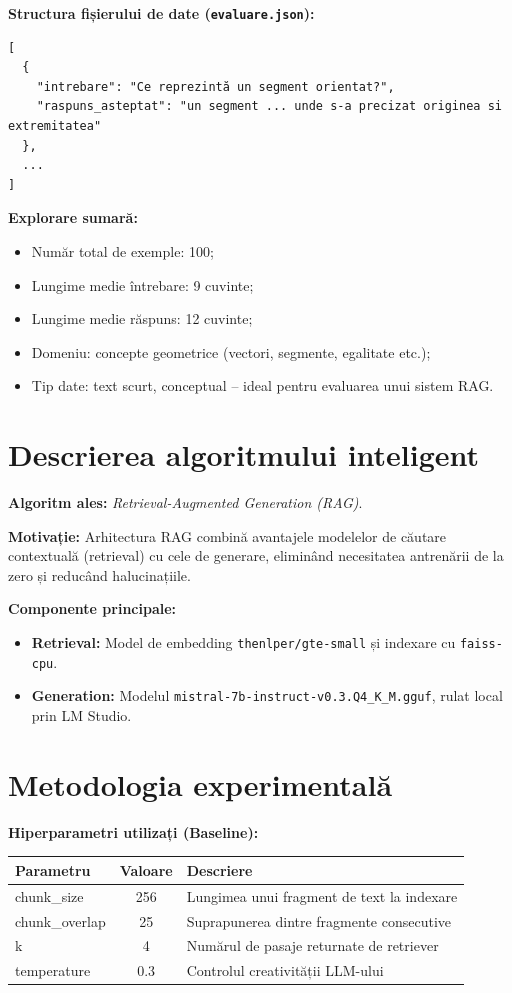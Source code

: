 \documentclass[12pt,a4paper]{report}
\begin{document}
\textbf{Structura fișierului de date (\texttt{evaluare.json}):}
\begin{verbatim}
[
  {
    "intrebare": "Ce reprezintă un segment orientat?",
    "raspuns_asteptat": "un segment ... unde s-a precizat originea si extremitatea"
  },
  ...
]
\end{verbatim}

\textbf{Explorare sumară:}
\begin{itemize}
  \item Număr total de exemple: 100;
  \item Lungime medie întrebare: 9 cuvinte;
  \item Lungime medie răspuns: 12 cuvinte;
  \item Domeniu: concepte geometrice (vectori, segmente, egalitate etc.);
  \item Tip date: text scurt, conceptual – ideal pentru evaluarea unui sistem RAG.
\end{itemize}

\section{Descrierea algoritmului inteligent}
\textbf{Algoritm ales:} \textit{Retrieval-Augmented Generation (RAG)}.

\textbf{Motivație:} Arhitectura RAG combină avantajele modelelor de căutare contextuală (retrieval) cu cele de generare, eliminând necesitatea antrenării de la zero și reducând halucinațiile.

\textbf{Componente principale:}
\begin{itemize}
  \item \textbf{Retrieval:} Model de embedding \texttt{thenlper/gte-small} și indexare cu \texttt{faiss-cpu}.
  \item \textbf{Generation:} Modelul \texttt{mistral-7b-instruct-v0.3.Q4\_K\_M.gguf}, rulat local prin LM Studio.
\end{itemize}

\section{Metodologia experimentală}
\textbf{Hiperparametri utilizați (Baseline):}
\begin{center}
\begin{tabular}{|l|c|p{6cm}|}
\hline
\textbf{Parametru} & \textbf{Valoare} & \textbf{Descriere} \\
\hline
chunk\_size & 256 & Lungimea unui fragment de text la indexare \\
\hline
chunk\_overlap & 25 & Suprapunerea dintre fragmente consecutive \\
\hline
k & 4 & Numărul de pasaje returnate de retriever \\
\hline
temperature & 0.3 & Controlul creativității LLM-ului \\
\hline
\end{tabular}
\end{center}
\end{document}
